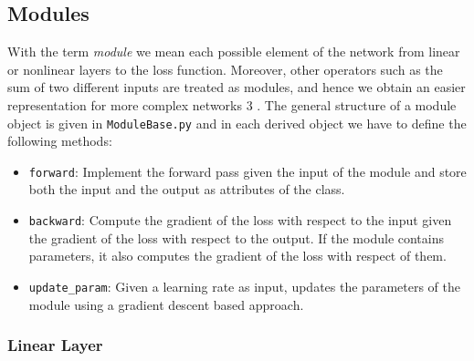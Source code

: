 \documentclass{article}
\begin{document}
\subsection{Modules}
With the term \emph{module} we mean each possible element of the network from linear or nonlinear layers to the loss function. 
Moreover, other operators such as the sum of two different inputs are treated as modules, and hence we obtain an easier representation for more complex networks 3 .
The general structure of a module object is given in \verb|ModuleBase.py| and in each derived object we have to define the following methods:
\begin{itemize}
\item \verb|forward|: Implement the forward pass given the input of the module and store both the input and the output as attributes of the class. 
\item \verb|backward|: Compute the gradient of the loss with respect to the input given the gradient of the loss with respect to the output. If the module contains parameters, it also computes the gradient of the loss with respect of them.
\item \verb|update_param|: Given a learning rate as input, updates the parameters of the module using a gradient descent based approach.
\end{itemize}
\subsubsection{Linear Layer}



\end{document}
